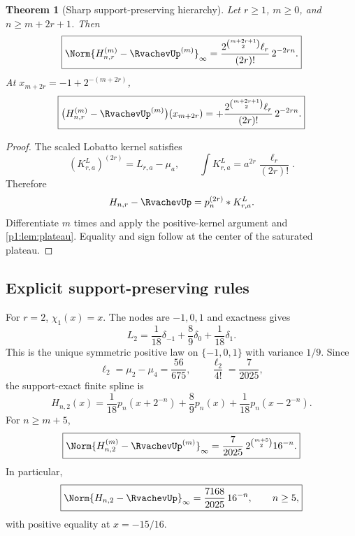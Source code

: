 \documentclass[11pt]{article}
\numberwithin{equation}{section}
\newtheorem{theorem}{Theorem}[section]
\theoremstyle{definition}
\theoremstyle{remark}
\begin{document}
\begin{theorem}[Sharp support-preserving hierarchy]
\label{p1:thm:L-exact}
Let $r\ge1$, $m\ge0$, and $n\ge m+2r+1$.  Then
\begin{equation}
 \boxed{
 \Norm{H_{n,r}^{(m)}-\RvachevUp^{(m)}}_\infty
 =\frac{2^{\binom{m+2r+1}{2}}\ell_r}{(2r)!}\,2^{-2rn}.}
 \label{p1:eq:L-exact}
\end{equation}
At $x_{m+2r}=-1+2^{-(m+2r)}$,
\begin{equation}
 \boxed{
 \bigl(H_{n,r}^{(m)}-\RvachevUp^{(m)}\bigr)(x_{m+2r})
 =+\frac{2^{\binom{m+2r+1}{2}}\ell_r}{(2r)!}\,2^{-2rn}.}
 \label{p1:eq:L-signed}
\end{equation}
\end{theorem}

\begin{proof}
The scaled Lobatto kernel satisfies
\[
 (K_{r,a}^L)^{(2r)}=L_{r,a}-\mu_a,
 \qquad
 \int K_{r,a}^L=a^{2r}\frac{\ell_r}{(2r)!}.
\]
Therefore
\begin{equation}
 H_{n,r}-\RvachevUp=p_n^{(2r)}*K_{r,a}^L.
 \label{p1:eq:L-factorization}
\end{equation}
Differentiate $m$ times and apply the positive-kernel argument and \cref{p1:lem:plateau}.  Equality and sign follow at the center of the saturated plateau.
\end{proof}

\subsection{Explicit support-preserving rules}

\begin{example}
For $r=2$, $\chi_1(x)=x$.  The nodes are $-1,0,1$ and exactness gives
\begin{equation}
 L_2=\frac1{18}\delta_{-1}+\frac89\delta_0+\frac1{18}\delta_1.
 \label{p1:eq:L2}
\end{equation}
This is the unique symmetric positive law on $\{-1,0,1\}$ with variance $1/9$.  Since
\[
 \ell_2=\mu_2-\mu_4=\frac{56}{675},
 \qquad
 \frac{\ell_2}{4!}=\frac7{2025},
\]
the support-exact finite spline is
\begin{equation}
 \boxed{
 H_{n,2}(x)=\frac1{18}p_n(x+2^{-n})
 +\frac89p_n(x)
 +\frac1{18}p_n(x-2^{-n}).}
 \label{p1:eq:Hn2}
\end{equation}
For $n\ge m+5$,
\begin{equation}
 \boxed{
 \Norm{H_{n,2}^{(m)}-\RvachevUp^{(m)}}_\infty
 =\frac7{2025}\,2^{\binom{m+5}{2}}16^{-n}.}
 \label{p1:eq:Hn2-error}
\end{equation}
In particular,
\begin{equation}
 \boxed{
 \Norm{H_{n,2}-\RvachevUp}_\infty
 =\frac{7168}{2025}\,16^{-n},\qquad n\ge5,}
 \label{p1:eq:Hn2-uniform}
\end{equation}
with positive equality at $x=-15/16$.
\end{example}
\end{document}
